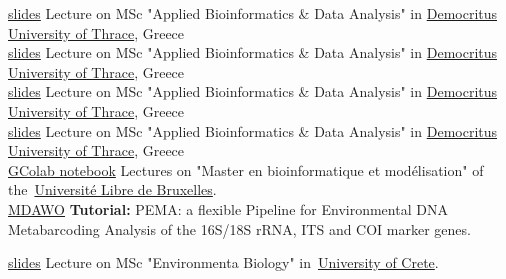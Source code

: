 \documentclass[
    a4paper,
]{fortysecondscv}
\begin{document}
\begin{cvtable}

    {\href{https://docs.google.com/presentation/d/1jNNGnUWEOk40eIGnJemGaThLcbmtyydaWyJZtGpLj7w/edit?usp=sharing}{slides}}
    {Lecture on MSc "Applied Bioinformatics \& Data Analysis" in \href{https://bioinfo.mbg.duth.gr}{Democritus University of Thrace}, Greece}{}\\


    {\href{https://docs.google.com/presentation/d/1ur_r9DRvZInixYkgDDYZNmVHH9mr15BKlIoVoCiyzhc/edit?usp=sharing}{slides}}
    {Lecture on MSc "Applied Bioinformatics \& Data Analysis" in \href{https://bioinfo.mbg.duth.gr}{Democritus University of Thrace}, Greece}{}\\

    {\href{https://docs.google.com/presentation/d/1FSObXaOt0HFq30UBypO4ui13oy1cbflxLRQJPQwfjC4/edit?usp=sharing}{slides}}
    {Lecture on MSc "Applied Bioinformatics \& Data Analysis" in \href{https://bioinfo.mbg.duth.gr}{Democritus University of Thrace}, Greece}{}\\

    {\href{https://docs.google.com/presentation/d/1FSObXaOt0HFq30UBypO4ui13oy1cbflxLRQJPQwfjC4/edit?usp=sharing}{slides}}
    {Lecture on MSc "Applied Bioinformatics \& Data Analysis" in \href{https://bioinfo.mbg.duth.gr}{Democritus University of Thrace}, Greece}{}\\

    {\href{https://colab.research.google.com/drive/1uL-oiSNAQoAL1qWyS4z_y94kWhHyT4hA?usp=sharing}{GColab notebook}}
    {Lectures on "Master en bioinformatique et modélisation" of the~\href{https://www.ulb.be/fr/programme/ma-binf}{Université Libre de Bruxelles}.}{}\\

    {\href{https://meetinghand.com/e/mdawo}{MDAWO}}
    {\textbf{Tutorial:} PEMA: a flexible Pipeline for Environmental DNA Metabarcoding Analysis of the 16S/18S rRNA, ITS and COI marker genes.}{}

    {\href{https://docs.google.com/presentation/d/19TVFO3Rw-1owvrqVdzmUzQUrYHZ1Vaw4ctVjBso-n-E/edit?usp=sharing}{slides}}
    {Lecture on MSc "Environmenta Biology" in~\href{http://envbio.biology.uoc.gr}{University of Crete}.}{}






\end{cvtable}
\end{document}
